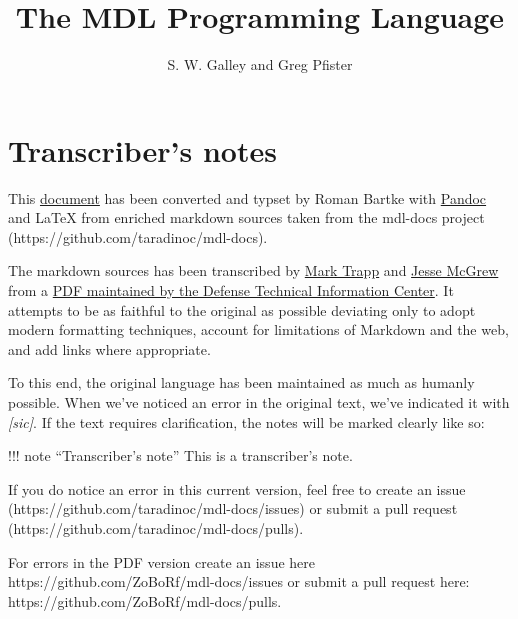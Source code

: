 \documentclass[a4paper]{scrbook}
\date{}
\begin{document}
\title{The MDL Programming Language}\label{the-mdl-programming-language}

\author{S. W. Galley and Greg Pfister}
\lowertitleback{Version of PDF conversion: 1.0\\
Date: 2020-08-23 19:22:00}
\publishers{Laboratory for Computer Science\\
Massachusetts Institute of Technology\\
\ \\
Cambridge\hfill Massachusetts 02139}
\maketitle
\tableofcontents{}


\section*{Transcriber's notes}\label{transcribers-notes}


This \href{https://github.com/ZoBoRf/mdl-docs}{document} has been converted and typset by Roman Bartke with
\href{https://pandoc.org/}{Pandoc} and \LaTeX{} from enriched markdown sources taken from the mdl-docs project
(https://github.com/taradinoc/mdl-docs).

The markdown sources has been transcribed by \href{https://marktrapp.com}{Mark Trapp} and
\href{https://bitbucket.org/jmcgrew}{Jesse McGrew} from a \href{http://www.dtic.mil/docs/citations/ADA070930}{PDF
maintained by the Defense Technical Information Center}. It attempts to be as faithful to the original as possible
deviating only to adopt modern formatting techniques, account for limitations of Markdown and the web, and add links where
appropriate.

To this end, the original language has been maintained as much as humanly possible. When we've noticed an error in the
original text, we've indicated it with \emph{{[}sic{]}}. If the text requires clarification, the notes will be marked
clearly like so:

!!! note ``Transcriber's note'' This is a transcriber's note.

If you do notice an error in this current version, feel free to create an issue
(https://github.com/taradinoc/mdl-docs/issues) or submit a pull request (https://github.com/taradinoc/mdl-docs/pulls).

For errors in the PDF version create an issue here https://github.com/ZoBoRf/mdl-docs/issues or submit a pull request here:
https://github.com/ZoBoRf/mdl-docs/pulls.
\end{document}
